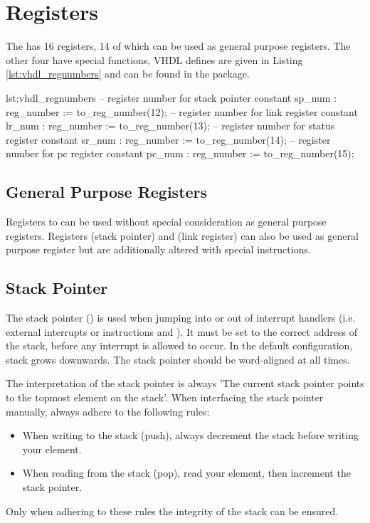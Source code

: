 \section{Registers}
The \procname has 16 registers, 14 of which can be used as general purpose registers.
The other four have special functions, VHDL defines are given in Listing \ref{lst:vhdl_regnumbers} and can be found in the  package.

\begin{vhdl}{lst:vhdl_regnumbers}
-- register number for stack pointer
constant sp_num : reg_number := to_reg_number(12);
-- register number for link register
constant lr_num : reg_number := to_reg_number(13);
-- register number for status register
constant sr_num : reg_number := to_reg_number(14);
-- register number for pc register
constant pc_num : reg_number := to_reg_number(15);
\end{vhdl}

\subsection{General Purpose Registers}
Registers  to  can be used without special consideration as general purpose registers.
Registers  (stack pointer) and  (link register) can also be used as general purpose register but are additionally altered with special instructions.
\subsection{Stack Pointer}
The stack pointer () is used when jumping into or out of interrupt handlers (i.e. external interrupts or  instructions and ).
It must be set to the correct address of the stack, before any interrupt is allowed to occur.
In the default configuration, stack grows downwards.
The stack pointer should be word-aligned at all times.

The interpretation of the stack pointer is always 'The current stack pointer points to the topmost element on the stack'.
When interfacing the stack pointer manually, always adhere to the following rules:
\begin{itemize}
\nolistskip
\item When writing to the stack (push), always decrement the stack before writing your element.
\item When reading from the stack (pop), read your element, then increment the stack pointer.
\end{itemize}
Only when adhering to these rules the integrity of the stack can be ensured.

